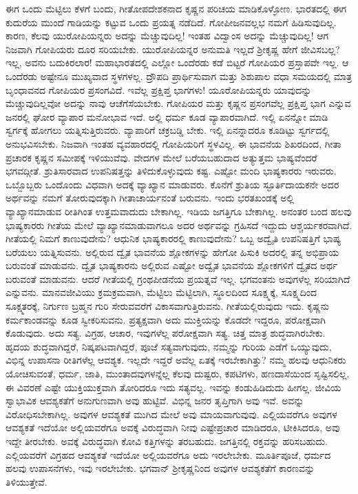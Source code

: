 ಈಗ ಒಂದು ಮೆಟ್ಟಿಲು ಕೆಳಗೆ ಬಂದು, ಗೀತೋಪದೇಶಕನಾದ ಕೃಷ್ಣನ ಪರಿಚಯ ಮಾಡಿಕೊಳ್ಳೋಣ. ಭಾರತದಲ್ಲಿ ಈಗ ಕುದುರೆಯ ಮುಂದೆ ಗಾಡಿಯನ್ನು ಕಟ್ಟುವ ಒಂದು ಪ್ರಯತ್ನ ನಡೆದಿದೆ. ಗೋಪೀಜನವಲ್ಲಭ ನಮಗೆ ಹಿಡಿಸುವುದಿಲ್ಲ. ಕಾರಣ, ಕೆಲವು ಯುರೋಪಿಯನ್ನರು ಅದನ್ನು ಮೆಚ್ಚುವುದಿಲ್ಲ! ಇಂತಹ ವಿದ್ವಾಂಸ ಅದನ್ನು ಮೆಚ್ಚುವುದಿಲ್ಲ! ಆಗ ನಿಜವಾಗಿ ಗೋಪಿಯರು ದೂರ ಸರಿಯಬೇಕು. ಯುರೋಪಿಯನ್ನರ ಅನುಮತಿ ಇಲ್ಲದೆ ಶ‍್ರೀಕೃಷ್ಣ ಹೇಗೆ ಜೀವಿಸಬಲ್ಲ? ಇಲ್ಲ, ಅವನು ಬದುಕಿರಲಾರ! ಮಹಾಭಾರತದಲ್ಲಿ ಎಲ್ಲೋ ಒಂದೆರಡು ಕಡೆ ಬಿಟ್ಟರೆ ಗೋಪಿಯರ ಪ್ರಸ್ತಾಪವೇ ಇಲ್ಲ. ಆ ಒಂದೆರಡು ಅಷ್ಟೇನೂ ಮುಖ್ಯವಾದ ಸ್ಥಳಗಳಲ್ಲ. ದ್ರೌಪದಿ ಪ್ರಾರ್ಥಿಸುವಾಗ ಮತ್ತು ಶಿಶುಪಾಲ ವಧಾ ಸಮಯದಲ್ಲಿ ಮಾತ್ರ ಬೃಂಧಾವನದ ಗೋಪಿಯರ ಪ್ರಸಂಗವಿದೆ. ಇವೆಲ್ಲ ಪ್ರಕ್ಷಿಪ್ತ ಭಾಗಗಳು! ಯೂರೋಪಿಯನ್ನರು ಯಾವುದನ್ನು ಮೆಚ್ಚುವುದಿಲ್ಲವೋ ಅದನ್ನು ನಾವು ಆಚೆಗೆಸೆಯಬೇಕು. ಗೋಪಿಯರ ಮತ್ತು ಕೃಷ್ಣನ ಪ್ರಸಂಗವೆಲ್ಲ ಪ್ರಕ್ಷಿಪ್ತ ಭಾಗ ಎನ್ನುವ ಜನರಲ್ಲಿ ಘೋರ ವ್ಯಾಪಾರ ಮನೋಭಾವ ಇದೆ. ಅಲ್ಲಿ ಧರ್ಮ ಕೂಡ ವ್ಯಾಪಾರವಾಗಿದೆ. ಇಲ್ಲಿ ಏನನ್ನೋ ಮಾಡಿ ಸ್ವರ್ಗಕ್ಕೆ ಹೋಗಲು ಯತ್ನಿಸುತ್ತಿರುವರು. ವ್ಯಾಪಾರಿಗೆ ಚಕ್ರಬಡ್ಡಿ ಬೇಕು. ಇಲ್ಲಿ ಏನನ್ನಾದರೂ ಕೂಡಿಟ್ಟು ಸ್ವರ್ಗದಲ್ಲಿ ಅನುಭವಿಸಬೇಕು. ನಿಜವಾಗಿ ಇಂತಹ ವ್ಯವಹಾರದಲ್ಲಿ ಗೋಪಿಯರಿಗೆ ಸ್ಥಳವಿಲ್ಲ. ಈ ಭಾವನೆಯ ಶಿಖರದಿಂದ, ಗೀತಾ ಪ್ರಚಾರಕ ಕೃಷ್ಣನ ಸಮೀಪಕ್ಕೆ ಇಳಿಯುವೆವು. ವೇದಗಳ ಮೇಲೆ ಬರೆಯಬಹುದಾದ ಅತ್ಯುತ್ತಮ ಭಾಷ್ಯವೆಂದರೆ ಭಗವದ್ಗೀತೆ. ಶ್ರುತಿಸಾರವಾದ ಉಪನಿಷತ್ತನ್ನು ತಿಳಿದುಕೊಳ್ಳುವುದು ಕಷ್ಟ. ಎಷ್ಟೋ ಮಂದಿ ಭಾಷ್ಯಕಾರರು ಇರುವರು. ಒಬ್ಬೊಬ್ಬರು ಒಂದೊಂದು ವಿಧವಾಗಿ ಅದಕ್ಕೆ ವ್ಯಾಖ್ಯಾನ ಮಾಡುವರು. ಕೊನೆಗೆ ಶ್ರುತಿಯ ಸ್ಫೂರ್ತಿದಾಯಕನೇ ಅದರ ಅರ್ಥವನ್ನು ನಮಗೆ ತೋರುವುದಕ್ಕಾಗಿ ಗೀತಾಚಾರ್ಯನಂತೆ ಬರುವನು. ಇಂದು ಭರತಖಂಡಕ್ಕೆ ಅಲ್ಲಿ ವ್ಯಾಖ್ಯಾನಮಾಡುವ ರೀತಿಗಿಂತ ಉತ್ತಮವಾದುದು ಬೇಕಾಗಿಲ್ಲ. ಇಡಿಯ ಜಗತ್ತಿಗೂ ಬೇಕಾಗಿಲ್ಲ. ಅನಂತರ ಬಂದ ಹಲವು ಭಾಷ್ಯಕಾರರು ಗೀತೆಯ ಮೇಲೆ ವ್ಯಾಖ್ಯಾನಮಾಡುವಾಗಲೂ ಅದರ ಅರ್ಥವನ್ನು ಗ್ರಹಿಸದೆ ಇದ್ದುದು ಆಶ್ಚರ್ಯಕರವಾಗಿದೆ. ಗೀತೆಯಲ್ಲಿ ನಿಮಗೆ ಕಾಣುವುದೇನು? ಆಧುನಿಕ ಭಾಷ್ಯಕಾರರಲ್ಲಿ ಕಾಣುವುದೇನು? ಒಬ್ಬ ಅದ್ವೈತಿ ಉಪನಿಷತ್ತಿಗೆ ಭಾಷ್ಯ ಬರೆಯಲು ಯತ್ನಿಸುವನು. ಅಲ್ಲಿರುವ ದ್ವೈತ ಭಾವನೆಯ ಶ್ಲೋಕಗಳನ್ನು ಹೇಗೋ ಹಿಸುಕಿ ಅದರಲ್ಲಿ ತನ್ನ ಅಭಿಪ್ರಾಯ ಬರುವಂತೆ ಮಾಡುವನು. ದ್ವೈತ ಭಾಷ್ಯಕಾರನು ಅಲ್ಲಿರುವ ಎಷ್ಟೋ ಅದ್ವೈತ ಭಾವನೆಯ ಶ್ಲೋಕಗಳಿಗೆ ದ್ವೈತದ ಅರ್ಥ ಬರುವಂತೆ ಮಾಡುವನು. ಆದರೆ ಗೀತೆಯಲ್ಲಿ ಗ್ರಂಥಪೀಡನೆಯ ಪ್ರಯತ್ನವೆ ಇಲ್ಲ. ಭಗವಂತನು ಅವುಗಳೆಲ್ಲ ಸರಿಯಾಗಿದೆ ಎನ್ನುವನು. ಮಾನವಜೀವಿಯು ಕ್ರಮಕ್ರಮವಾಗಿ, ಮೆಟ್ಟಿಲು ಮೆಟ್ಟಿಲಾಗಿ, ಸ್ಥೂಲದಿಂದ ಸೂಕ್ಷ್ಮಕ್ಕೆ, ಸೂಕ್ಷ್ಮದಿಂದ ಸೂಕ್ಷ್ಮತರಕ್ಕೆ, ನಿರ್ಗುಣ ಬ್ರಹ್ಮನ ಗುರಿ ಸೇರುವವರೆಗೆ ವಿಕಾಸವಾಗುತ್ತಿರುವನು. ಗೀತೆಯಲ್ಲಿರುವುದು ಇದು. ಕೃಷ್ಣನು ಕರ್ಮಕಾಂಡವನ್ನು ಕೂಡ ಸ್ವೀಕರಿಸುವನು. ಪ್ರತ್ಯಕ್ಷವಾಗಿ ಅದು ಮುಕ್ತಿಯನ್ನು ಕೊಡದೇ ಇದ್ದರೂ, ಪರೋಕ್ಷವಾಗಿ ಕೊಡುವುದು. ಅದು ಸತ್ಯ. ವಿಗ್ರಹ, ಆಚಾರ, ಇವುಗಳೆಲ್ಲ ಪರೋಕ್ಷವಾಗಿ ಸತ್ಯ. ಚಿತ್ತ ಮಾತ್ರ ಶುದ್ಧವಾಗಿರಬೇಕು. ಹೃದಯ ಶುದ್ಧವಾಗಿದ್ದರೆ, ನಿಷ್ಕಪಟವಾಗಿದ್ದರೆ, ಪೂಜೆ ಸತ್ಯವಾಗುವುದು, ನಮ್ಮನ್ನು ಗುರಿಯ ಎಡೆಗೆ ಒಯ್ಯುವುದು, ವಿಭಿನ್ನ ಉಪಾಸನಾ ರೀತಿಗಳೆಲ್ಲ ಆವಶ್ಯಕ. ಇಲ್ಲದೇ ಇದ್ದರೆ ಅವೆಲ್ಲ ಏತಕ್ಕೆ ಇರಬೇಕಾಗಿತ್ತು? ನಮ್ಮ ಹಲವು ಆಧುನಿಕರು ಯೋಚಿಸುವಂತೆ, ಧರ್ಮ, ಜಾತಿ, ಮುಂತಾದವುಗಳನ್ನೆಲ್ಲ ಕೆಲವು ದುಷ್ಟರು, ಕಪಟಿಗಳು, ಹಣದಾಸೆಯಿಂದ ಸೃಷ್ಟಿಸಲಿಲ್ಲ. ಈ ವಿವರಣೆ ಎಷ್ಟೇ ಯುಕ್ತಿಯುಕ್ತವಾಗಿ ತೋರಿದರೂ ಇದು ಸತ್ಯವಲ್ಲ. ಇವನ್ನು ಕಂಡುಹಿಡಿದುದು ಹೀಗಲ್ಲ. ಜೀವಿಯ ಸ್ವಾಭಾವಿಕ ಆವಶ್ಯಕತೆಗೆ ಅನುಗುಣವಾಗಿ ಅವು ಹುಟ್ಟಿವೆ. ವಿಭಿನ್ನ ಜನರ ತೃಪ್ತಿಗಾಗಿ ಅವು ಇವೆ. ಅವನ್ನು ವಿರೋಧಿಸಬೇಕಾಗಿಲ್ಲ. ಅವುಗಳ ಆವಶ್ಯಕತೆ ಮುಗಿದ ಮೇಲೆ ಅವು ಮಾಯವಾಗುವುವು. ಎಲ್ಲಿಯವರೆಗೂ ಅವುಗಳ ಆವಶ್ಯಕತೆ ಇದೆಯೋ ಅಲ್ಲಿಯವರೆಗೂ ಅವಕ್ಕೆ ವಿರುದ್ಧವಾಗಿ ನೀವು ಎಷ್ಟೇಪ್ರಚಾರ ಮಾಡಿದರೂ, ಟೀಕಿಸಿದರೂ, ಅವು ಇದ್ದೇ ತೀರಬೇಕು. ಅವಕ್ಕೆ ವಿರುದ್ಧವಾಗಿ ಕೋವಿ ಕತ್ತಿಗಳನ್ನು ತರಬಹುದು. ಜಗತ್ತಿನಲ್ಲಿ ರಕ್ತವನ್ನು ಹರಿಸಬಹುದು. ಎಲ್ಲಿಯವರೆಗೆ ವಿಗ್ರಹದ ಆವಶ್ಯಕತೆ ಇದೆಯೋ ಅಲ್ಲಿಯವರೆಗೂ ಅದು ಇರಲೇಬೇಕು. ಮೂರ್ತಿಪೂಜೆ, ಧರ್ಮದ ಹಲವು ಉಪಾಸನೆಗಳು, ಇವು ಇರಲೇಬೇಕು. ಭಗವಾನ್​ ಶ‍್ರೀಕೃಷ್ಣನಿಂದ ಅವುಗಳ ಆವಶ್ಯಕತೆಗೆ ಕಾರಣವನ್ನು ತಿಳಿಯುತ್ತೇವೆ.

